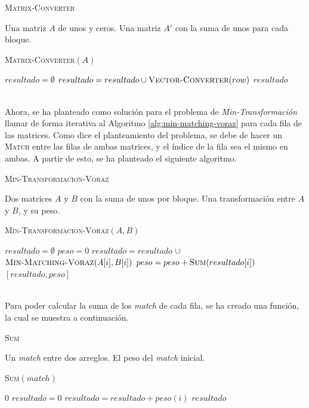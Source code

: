 \documentclass[conference]{IEEEtran}
\begin{document}
\begin{algorithm}
\caption{\textsc{Matrix-Converter}}
\scriptsize
\begin{algorithmic}
\REQUIRE Una matriz $A$ de unos y ceros.
\ENSURE Una matriz $A'$ con la suma de unos para cada bloque.
\begin{flushleft}
\textsc{Matrix-Converter}$(A)$
\end{flushleft}
    \STATE $resultado=\emptyset$
        \STATE $resultado=resultado \cup \textsc{Vector-Converter}(row)$
    \ENDFOR
    \RETURN $resultado$
\end{algorithmic}
\label{alg:matrix-converter}
\end{algorithm}
\verb||\\
Ahora, se ha planteado como solución para el problema de \textit{Min-Transformación} llamar de forma iterativa al Algoritmo \ref{alg:min-matching-voraz} para cada fila de las matrices. Como dice el planteamiento del problema, se debe de hacer un \textsc{Match} entre las filas de ambas matrices, y el índice de la fila sea el mismo en ambas. A partir de esto, se ha planteado el siguiente algoritmo.

\begin{algorithm}
\caption{\textsc{Min-Transformacion-Voraz}}
\scriptsize
\begin{algorithmic}
\REQUIRE Dos matrices $A$ y $B$ con la suma de unos por bloque.
\ENSURE Una transformación entre $A$ y $B$, y su peso.
\begin{flushleft}
\textsc{Min-Transformacion-Voraz}$(A,B)$
\end{flushleft}
    \STATE $resultado=\emptyset$
    \STATE $peso=0$
        \STATE $resultado=resultado$ $\cup$ $\textsc{Min-Matching-Voraz}(A[i],B[i])$
    \ENDFOR
        \STATE $peso=peso+\textsc{Sum}(resultado[i])$
    \ENDFOR
    \RETURN $[resultado,peso]$
\end{algorithmic}
\label{alg:min-transformacion-voraz}
\end{algorithm}
\verb||\\
Para poder calcular la suma de los \textit{match} de cada fila, se ha creado una función, la cual se muestra a continuación.

\begin{algorithm}
\caption{\textsc{Sum}}
\scriptsize
\begin{algorithmic}
\REQUIRE Un \textit{match} entre dos arreglos.
\ENSURE El peso del \textit{match} inicial.
\begin{flushleft}
\textsc{Sum}$(match)$
\end{flushleft}
        \RETURN $0$
    \ENDIF
    \STATE $resultado=0$
        \STATE $resultado=resultado+peso(i)$
    \ENDFOR
    \RETURN $resultado$
\end{algorithmic}
\label{alg:sum}
\end{algorithm}
\end{document}
